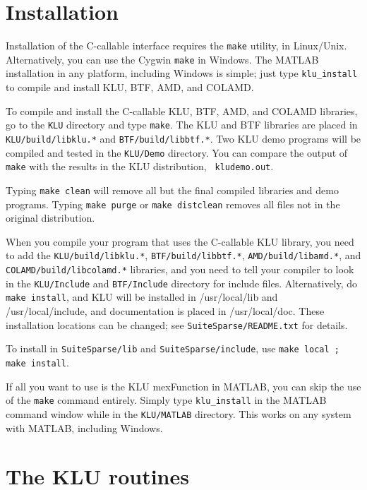 \documentclass[11pt]{article}
\begin{document}
\section{Installation}
\label{Install}

Installation of the C-callable interface requires the {\tt make} utility, in
Linux/Unix.  Alternatively, you can use the Cygwin {\tt make} in Windows.
The MATLAB installation in any platform, including Windows is simple; just
type {\tt klu\_install} to compile and install KLU, BTF, AMD, and COLAMD.

To compile and install the C-callable KLU, BTF, AMD, and COLAMD libraries, go
to the {\tt KLU} directory and type {\tt make}.  The KLU and BTF libraries are
placed in {\tt KLU/build/libklu.*} and {\tt BTF/build/libbtf.*}.
Two KLU demo
programs will be compiled and tested in the {\tt KLU/Demo} directory.  You can
compare the output of {\tt make} with the results in the KLU distribution, {\tt
kludemo.out}.

Typing {\tt make clean} will remove all but the final compiled libraries and
demo programs.  Typing {\tt make purge} or {\tt make distclean} removes all
files not in the original distribution.

When you compile your program that uses the C-callable KLU library, you need to
add the {\tt KLU/build/libklu.*}, {\tt BTF/build/libbtf.*}, {\tt AMD/build/libamd.*},
and {\tt COLAMD/build/libcolamd.*} libraries, and you need to tell your compiler to
look in the {\tt KLU/Include} and {\tt BTF/Include} directory for include
files.
Alternatively, do {\tt make install}, and KLU will be installed in
/usr/local/lib and /usr/local/include, and documentation is placed in
/usr/local/doc.  These installation locations can be changed;
see {\tt SuiteSparse/README.txt} for details.

To install in \verb'SuiteSparse/lib'
and \verb'SuiteSparse/include', use \verb'make local ; make install'.

If all you want to use is the KLU mexFunction in MATLAB, you can skip the use
of the {\tt make} command entirely.  Simply type {\tt klu\_install} in the
MATLAB command window while in the {\tt KLU/MATLAB} directory.  This works on
any system with MATLAB, including Windows.

\newpage
\section{The KLU routines}
\label{klu_include}
\end{document}
